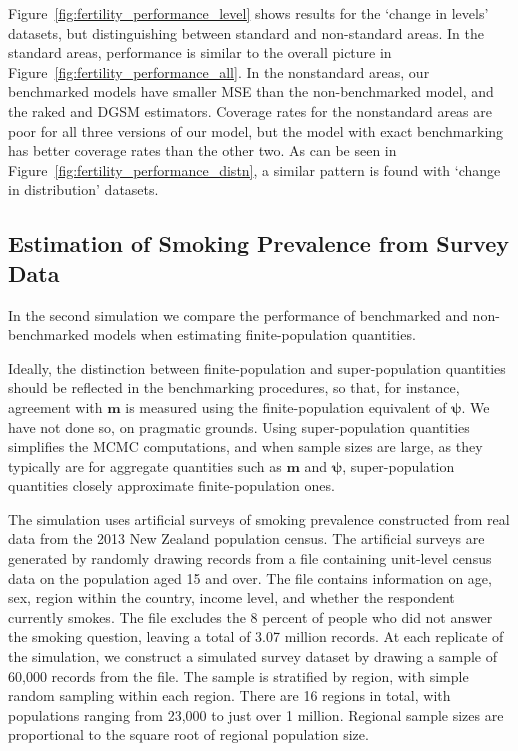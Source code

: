 \documentclass[12pt]{article}
\begin{document}
Figure~\ref{fig:fertility_performance_level} shows results for the `change in levels' datasets, but distinguishing between standard and non-standard areas.  In the standard areas, performance is similar to the overall picture in Figure~\ref{fig:fertility_performance_all}.  In the nonstandard areas, our benchmarked models have smaller MSE than the non-benchmarked model, and the raked and DGSM estimators. Coverage rates for the nonstandard areas are poor for all three versions of our model, but the model with exact benchmarking has better coverage rates than the other two.  As can be seen in Figure~\ref{fig:fertility_performance_distn}, a similar pattern is found with `change in distribution' datasets.

\subsection{Estimation of Smoking Prevalence from Survey Data}
  \label{sec:smoking}

In the second simulation we compare the performance of benchmarked and non-benchmarked models when estimating finite-population quantities.

Ideally, the distinction between finite-population and super-population quantities should be reflected in the benchmarking procedures, so that, for instance, agreement with $\bm{m}$ is measured using the finite-population equivalent of $\bm{\psi}$.  We have not done so, on pragmatic grounds.  Using super-population quantities simplifies the MCMC computations, and when sample sizes are large, as they typically are for aggregate quantities such as $\bm{m}$ and $\bm{\psi}$, super-population quantities closely approximate finite-population ones.

The simulation uses artificial surveys of smoking prevalence constructed from real data from the 2013 New Zealand population census.
The artificial surveys are generated by randomly drawing records from a file containing unit-level census data on the population aged 15 and over.  The file contains information on age, sex, region within the country, income level, and whether the respondent currently smokes.  The file excludes the 8 percent of people who did not answer the smoking question, leaving a total of 3.07 million records.  At each replicate of the simulation, we construct a simulated survey dataset by drawing a sample of 60,000 records from the file.  The sample is stratified by region, with simple random sampling within each region.  There are 16 regions in total, with populations ranging from 23,000 to just over 1 million.  Regional sample sizes are proportional to the square root of regional population size.
\end{document}
